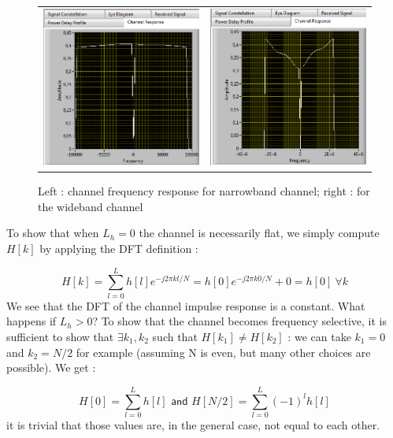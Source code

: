 \documentclass{article}
\begin{document}
\begin{figure}[h!]
    \centering
    \begin{tabular}{c c}
     \includegraphics[width = 0.4 \textwidth ]{narrowRep} & \includegraphics[width = 0.4 \textwidth]{wideRep} \\
    \end{tabular}
    \caption{Left : channel frequency response for narrowband channel; right : for the wideband channel}
    \label{narrowflat}
\end{figure}
    
To show that when $L_h = 0$ the channel is necessarily flat, we simply compute $H[k]$ by applying the DFT definition : 

\begin{equation}
H[k] = \sum_{l=0}^{L} h[l] e^{-j2 \pi kl/N} = h[0]e^{-j2 \pi k0/N} + 0 = h[0] \: \forall k
\end{equation}
We see that the DFT of the channel impulse response is a constant. What happens if $L_h > 0$? To show that the channel becomes frequency selective, it is sufficient to show that $\exists k_1,k_2$ such that $H[k_1] \neq H[k_2]$ : we can take $k_1 = 0$ and $k_2 = N/2$ for example (assuming N is even, but many other choices are possible). We get :

\begin{equation}
H[0] = \sum_{l=0}^{L} h[l] \textsf{ and } H[N/2] = \sum_{l=0}^{L} (-1)^{l} h[l] 
\end{equation}
it is trivial that those values are, in the general case, not equal to each other.
\end{document}
